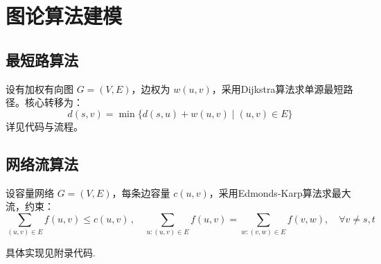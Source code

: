 \section{图论算法建模}
\subsection{最短路算法}
设有加权有向图 $G=(V,E)$，边权为 $w(u,v)$，采用Dijkstra算法求单源最短路径。核心转移为：
\[
d(s,v) = \min\{d(s,u) + w(u,v) \mid (u,v) \in E \}
\]
详见代码与流程。

\subsection{网络流算法}
设容量网络 $G=(V,E)$，每条边容量 $c(u,v)$，采用Edmonds-Karp算法求最大流，约束：
\[
\sum_{(u,v)\in E} f(u,v) \leq c(u,v)\,,\quad \sum_{u:(u,v)\in E} f(u,v) = \sum_{w:(v,w)\in E} f(v,w),\quad \forall v \neq s,t
\]

具体实现见附录代码.
